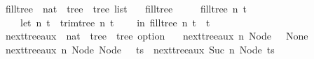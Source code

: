 \begin{isabellebody}
\isanewline
{}\isamarkupfalse%
\ fill{\isacharunderscore}{\kern0pt}tree\ {\isacharcolon}{\kern0pt}{\isacharcolon}{\kern0pt}\ {\isachardoublequoteopen}nat\ {\isasymRightarrow}\ tree\ {\isasymRightarrow}\ tree\ list{\isachardoublequoteclose}\ \isanewline
\ \ {\isachardoublequoteopen}fill{\isacharunderscore}{\kern0pt}tree\ {}\ {\isacharunderscore}{\kern0pt}\ {\isacharequal}{\kern0pt}\ {\isacharbrackleft}{\kern0pt}{\isacharbrackright}{\kern0pt}{\isachardoublequoteclose}\isanewline
{\isacharbar}{\kern0pt}\ {\isachardoublequoteopen}fill{\isacharunderscore}{\kern0pt}tree\ n\ t\ {\isacharequal}{\kern0pt}\isanewline
\ \ \ \ {\isacharparenleft}{\kern0pt}let\ {\isacharparenleft}{\kern0pt}n{\isacharprime}{\kern0pt}{\isacharcomma}{\kern0pt}\ t{\isacharprime}{\kern0pt}{\isacharparenright}{\kern0pt}\ {\isacharequal}{\kern0pt}\ trim{\isacharunderscore}{\kern0pt}tree\ n\ t\isanewline
\ \ \ \ in\ fill{\isacharunderscore}{\kern0pt}tree\ n{\isacharprime}{\kern0pt}\ t{\isacharprime}{\kern0pt}\ {\isacharat}{\kern0pt}\ {\isacharbrackleft}{\kern0pt}t{\isacharprime}{\kern0pt}{\isacharbrackright}{\kern0pt}{\isacharparenright}{\kern0pt}{\isachardoublequoteclose}\isanewline
\isanewline
{}\isamarkupfalse%
\ next{\isacharunderscore}{\kern0pt}tree{\isacharunderscore}{\kern0pt}aux\ {\isacharcolon}{\kern0pt}{\isacharcolon}{\kern0pt}\ {\isachardoublequoteopen}nat\ {\isasymRightarrow}\ tree\ {\isasymRightarrow}\ tree\ option{\isachardoublequoteclose}\ \isanewline
\ \ {\isachardoublequoteopen}next{\isacharunderscore}{\kern0pt}tree{\isacharunderscore}{\kern0pt}aux\ n\ {\isacharparenleft}{\kern0pt}Node\ {\isacharbrackleft}{\kern0pt}{\isacharbrackright}{\kern0pt}{\isacharparenright}{\kern0pt}\ {\isacharequal}{\kern0pt}\ None{\isachardoublequoteclose}\isanewline
{\isacharbar}{\kern0pt}\ {\isachardoublequoteopen}next{\isacharunderscore}{\kern0pt}tree{\isacharunderscore}{\kern0pt}aux\ n\ {\isacharparenleft}{\kern0pt}Node\ {\isacharparenleft}{\kern0pt}Node\ {\isacharbrackleft}{\kern0pt}{\isacharbrackright}{\kern0pt}\ {\isacharhash}{\kern0pt}\ ts{\isacharparenright}{\kern0pt}{\isacharparenright}{\kern0pt}\ {\isacharequal}{\kern0pt}\ next{\isacharunderscore}{\kern0pt}tree{\isacharunderscore}{\kern0pt}aux\ {\isacharparenleft}{\kern0pt}Suc\ n{\isacharparenright}{\kern0pt}\ {\isacharparenleft}{\kern0pt}Node\ ts{\isacharparenright}{\kern0pt}{\isachardoublequoteclose}\isanewline

\end{isabellebody}
